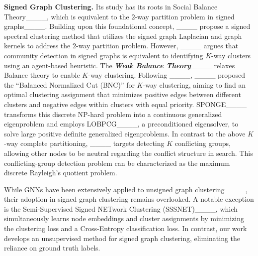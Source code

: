 \textbf{Signed Graph Clustering.}
Its study has its roots in Social Balance Theory____, which is equivalent to the $2$-way partition problem in signed graphs____. 
Building upon this foundational concept, ____ propose a signed spectral clustering method that utilizes the signed graph Laplacian and graph kernels to address the $2$-way partition problem.  However, ____ argues that community detection in signed graphs is equivalent to identifying $K$-way clusters using an agent-based heuristic. The \textbf{\textit{Weak Balance Theory}}____ relaxes Balance theory to enable $K$-way clustering. Following ____, ____ proposed the ``Balanced Normalized Cut (BNC)'' for $K$-way clustering, aiming to find an optimal clustering assignment that minimizes positive edges between different clusters and negative edges within clusters with equal priority. SPONGE____ transforms this discrete NP-hard problem into a continuous generalized eigenproblem and employs LOBPCG____, a preconditioned eigensolver, to solve large positive definite generalized eigenproblems. In contrast to the above $K$-way complete partitioning, ____ targets detecting $K$ conflicting groups, allowing other nodes to be neutral regarding the conflict structure in search. This conflicting-group detection problem can be characterized as the maximum discrete Rayleigh's quotient problem.

While GNNs have been extensively applied to unsigned graph clustering____, their adoption in signed graph clustering remains overlooked. A notable exception is the Semi-Supervised Signed NETwork Clustering (SSSNET)____, which simultaneously learns node embeddings and cluster assignments by minimizing the clustering loss and a Cross-Entropy classification loss. In contrast, our work develops an unsupervised method for signed graph clustering, eliminating the reliance on ground truth labels.